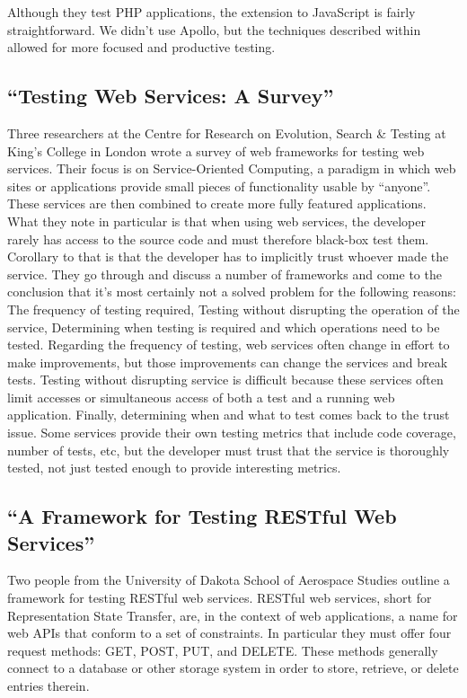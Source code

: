 \documentclass[12pt]{ucthesis}
\begin{document}
Although they test PHP applications, the extension to JavaScript is fairly straightforward. We didn't use Apollo, but the techniques described within allowed for more focused and productive testing.

\subsection{``Testing Web Services: A Survey''}
Three researchers at the Centre for Research on Evolution, Search \& Testing at King's College in London wrote a survey of web frameworks for testing web services\cite{TestingWebServicesSurvey}. Their focus is on Service-Oriented Computing, a paradigm in which web sites or applications provide small pieces of functionality usable by ``anyone''. These services are then combined to create more fully featured applications. What they note in particular is that when using web services, the developer rarely has access to the source code and must therefore black-box test them. Corollary to that is that the developer has to implicitly trust whoever made the service. They go through and discuss a number of frameworks and come to the conclusion that it's most certainly not a solved problem for the following reasons: The frequency of testing required, Testing without disrupting the operation of the service, Determining when testing is required and which operations need to be tested. Regarding the frequency of testing, web services often change in effort to make improvements, but those improvements can change the services and break tests. Testing without disrupting service is difficult because these services often limit accesses or simultaneous access of both a test and a running web application. Finally, determining when and what to test comes back to the trust issue. Some services provide their own testing metrics that include code coverage, number of tests, etc, but the developer must trust that the service is thoroughly tested, not just tested enough to provide interesting metrics.

\subsection{``A Framework for Testing RESTful Web Services''}
Two people from the University of Dakota School of Aerospace Studies outline a framework for testing RESTful web services\cite{RESTfulFramework}. RESTful web services, short for Representation State Transfer, are, in the context of web applications, a name for web APIs that conform to a set of constraints. In particular they must offer four request methods: GET, POST, PUT, and DELETE. These methods generally connect to a database or other storage system in order to store, retrieve, or delete entries therein.
\end{document}

